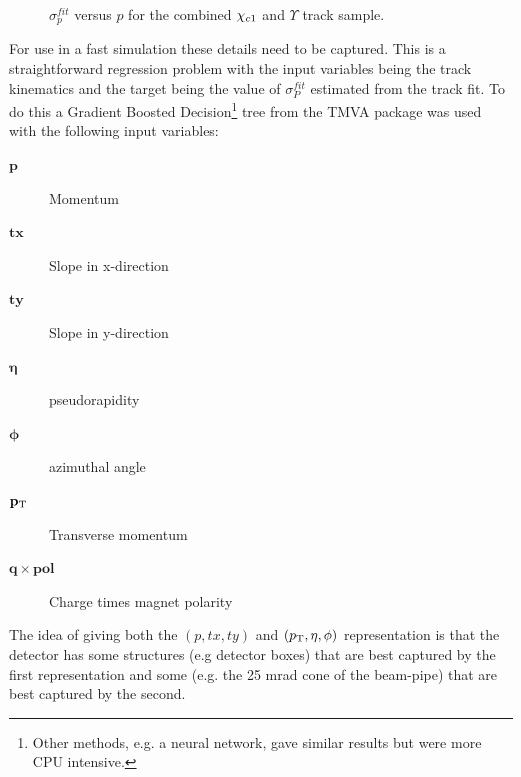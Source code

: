 \begin{figure}[htb!]
\begin{center}
\caption{\small $\sigma^{fit}_{p}$ versus $p$ for the combined
  ${\chi_{{c} 1}}$ and $\Upsilon$ track sample. }
\label{fig:eppfit}
\end{center}
\end{figure}

For use in a fast simulation these details need to be captured. 
This is a straightforward regression problem with the
input variables being the track kinematics and the target being the
value of $\sigma^{fit}_{P}$ estimated from the track fit. To do this a
Gradient Boosted Decision\footnote{Other methods, e.g. a neural
  network, gave similar results but were more CPU intensive.} tree from the TMVA package \cite{Hocker:2007ht} was
used with the following input variables:
\begin{description}
\item[$\mathbf{p}$] Momentum
\item[$\mathbf{tx}$] Slope in x-direction
\item[$\mathbf{ty}$] Slope in y-direction
\item[$\boldsymbol{\eta}$] pseudorapidity
\item[$\boldsymbol{\phi}$] azimuthal angle
\item[$\mathbf{p_{\mathrm{T}}}$] Transverse momentum
\item[$\mathbf{q\times pol}$] Charge times magnet polarity
\end{description}
The idea of giving both the $(p,tx,ty)$ and $(p_{\mathrm{T}},\eta,\phi)$
representation is that the detector has some structures (e.g detector
boxes) that are best captured by the first representation and some
(e.g. the 25 mrad cone of the beam-pipe) that are best captured by the
second. 

